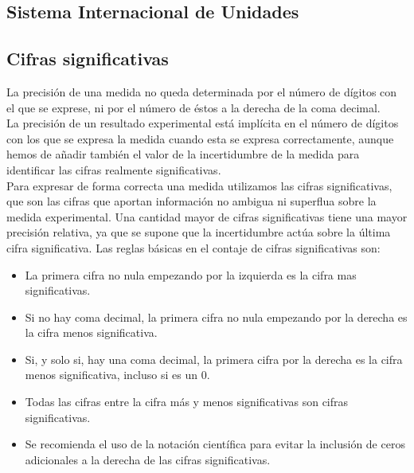 \documentclass[12pt,a4paper]{book}
\begin{document}
\subsection{Sistema Internacional de Unidades}

\subsection{Cifras significativas}

La precisión de una medida no queda determinada por el número de dígitos con el que se exprese, ni por el número de éstos a la derecha de la coma decimal. \\

La precisión de un resultado experimental está implícita en el número de dígitos con los que se expresa la medida cuando esta se expresa correctamente, aunque hemos de añadir también el valor de la incertidumbre de la medida para identificar las cifras realmente significativas. \\

Para expresar de forma correcta una medida utilizamos las cifras significativas, que son las cifras que aportan información no ambigua ni superflua sobre la medida experimental. Una cantidad mayor de cifras significativas tiene una mayor precisión relativa, ya que se supone que la incertidumbre actúa sobre la última cifra significativa.  Las reglas básicas en el contaje de cifras significativas son: 

\begin{itemize}
\item La primera cifra no nula empezando por la izquierda es la cifra mas significativas.

\item Si no hay coma decimal, la primera cifra no nula empezando por la derecha es la cifra menos significativa. 

\item Si, y solo si, hay una coma decimal, la primera cifra por la derecha es la cifra menos significativa, incluso si es un 0. 

\item Todas las cifras entre la cifra más y menos significativas son cifras significativas.

\item Se recomienda el uso de la notación científica para evitar la inclusión de ceros adicionales a la derecha de las cifras significativas. 

\end{itemize}
\end{document}
